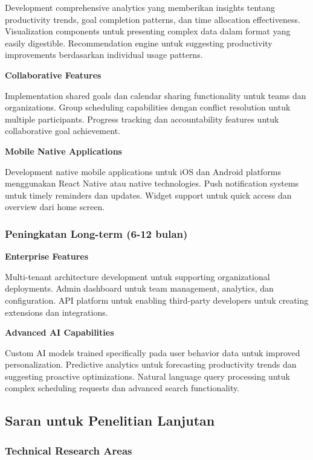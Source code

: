 Development comprehensive analytics yang memberikan insights tentang productivity trends, goal completion patterns, dan time allocation effectiveness. Visualization components untuk presenting complex data dalam format yang easily digestible. Recommendation engine untuk suggesting productivity improvements berdasarkan individual usage patterns.

\textbf{Collaborative Features}

Implementation shared goals dan calendar sharing functionality untuk teams dan organizations. Group scheduling capabilities dengan conflict resolution untuk multiple participants. Progress tracking dan accountability features untuk collaborative goal achievement.

\textbf{Mobile Native Applications}

Development native mobile applications untuk iOS dan Android platforms menggunakan React Native atau native technologies. Push notification systems untuk timely reminders dan updates. Widget support untuk quick access dan overview dari home screen.

\subsubsection{Peningkatan Long-term (6-12 bulan)}

\textbf{Enterprise Features}

Multi-tenant architecture development untuk supporting organizational deployments. Admin dashboard untuk team management, analytics, dan configuration. API platform untuk enabling third-party developers untuk creating extensions dan integrations.

\textbf{Advanced AI Capabilities}

Custom AI models trained specifically pada user behavior data untuk improved personalization. Predictive analytics untuk forecasting productivity trends dan suggesting proactive optimizations. Natural language query processing untuk complex scheduling requests dan advanced search functionality.

\subsection{Saran untuk Penelitian Lanjutan}

\subsubsection{Technical Research Areas}

